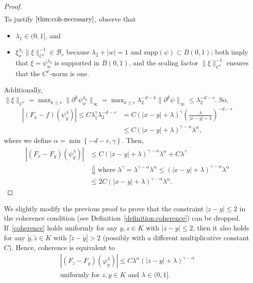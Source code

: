 \begin{proof}
\begin{align}
   \end{align}
   To justify \(\eqref{thm:coh-necessary}\), observe that 
   \begin{itemize}
       \item  \(\lambda_1 \in (0, 1]\), and 
       \item  \(\xi^{\lambda_1}_x \lVert \xi \rVert_{C^{r}}^{-1} \in \mathcal{B}_{r}\) because \(\lambda_2 + |w| = 1\) and \(\mathrm{supp}(\psi) \subset B(0,1)\); both imply that \(\xi = \psi^{\lambda_2}_w\) is supported in \(B(0,1)\), and the scaling factor \(\lVert \xi \rVert_{C^{r}}^{-1}\) ensures that the \(C^r\)-norm is one.
   \end{itemize}   
   Additionally, \(\lVert \xi \rVert_{C^{r}} = \max_{k \leq r}\lVert \partial^k \psi^{\lambda_2}_w \rVert_\infty = \max_{k \leq r} \lambda_2^{-d-k} \lVert \partial^k \psi \rVert_{\infty} \leq \lambda_2^{-d - r}\). So,
   \begin{align*}
    |(F_x - f)(\psi^\lambda_y)| \leq C\lambda_1^\gamma \lambda_2^{-d-r} &= C(|x-y| + \lambda)^\gamma\left(\frac{\lambda}{|x-y|  + \lambda}\right)^{-d-r} \\
    &\leq C  (|x-y| + \lambda)^{\gamma - \alpha} \lambda^\alpha,
   \end{align*}
    where we define \(\alpha = \min\left\{ -d-r , \gamma \right\}\). Then,
    \begin{align*}
        |(F_x - F_y)(\psi^\lambda_y)| &\leq C  (|x-y| + \lambda)^{\gamma - \alpha} \lambda^\alpha + C \lambda^\gamma \\
        &\Downarrow \text{where \(\lambda^\gamma = \lambda^{\gamma - \alpha} \lambda^\alpha \leq (|x-y| + \lambda)^{\gamma - \alpha} \lambda^\alpha\)} \\
        &\leq 2C  (|x-y| + \lambda)^{\gamma - \alpha} \lambda^\alpha.
    \end{align*}
\end{proof}

We slightly modify the previous proof to prove that the constraint \(|z-y| \leq 2\) in the coherence condition (see Definition~\ref{definition:coherence}) can be dropped. If~\eqref{coherence} holds uniformly for any \(y,z \in K\) with \(|z-y| \leq 2\), then it also holds for any \(\tilde y, \tilde z \in K\) with \(|\tilde z- \tilde y| > 2\) (possibly with a different multiplicative constant \(C\)). Hence, coherence is equivalent to
\begin{gather}\label{better-coherence}
    |(F_z - F_y)(\varphi^\lambda_y)| \leq C\lambda^\alpha(|z-y| + \lambda)^{\gamma - \alpha}  \\ \text{uniformly for \(z,y \in K\) and \(\lambda \in (0,1]\)} \nonumber.
\end{gather}

